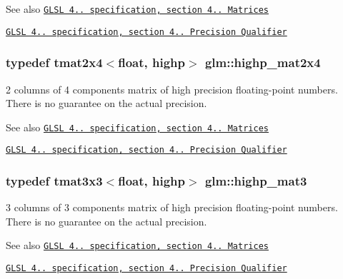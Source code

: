 \begin{DoxySeeAlso}{See also}
\href{http://www.opengl.org/registry/doc/GLSLangSpec.4.20.8.pdf}{\tt G\+L\+S\+L 4.. specification, section 4.. Matrices} 

\href{http://www.opengl.org/registry/doc/GLSLangSpec.4.20.8.pdf}{\tt G\+L\+S\+L 4.. specification, section 4.. Precision Qualifier} 
\end{DoxySeeAlso}
\hypertarget{namespaceglm_aa1e8839e63b86df92204fc1c4a25dd39}{}
\subsubsection[{highp\+\_\+mat2x4}]{\setlength{\rightskip}{0pt plus 5cm}typedef tmat2x4$<$float, highp$>$ {\bf glm\+::highp\+\_\+mat2x4}}\label{namespaceglm_aa1e8839e63b86df92204fc1c4a25dd39}
2 columns of 4 components matrix of high precision floating-\/point numbers. There is no guarantee on the actual precision.

\begin{DoxySeeAlso}{See also}
\href{http://www.opengl.org/registry/doc/GLSLangSpec.4.20.8.pdf}{\tt G\+L\+S\+L 4.. specification, section 4.. Matrices} 

\href{http://www.opengl.org/registry/doc/GLSLangSpec.4.20.8.pdf}{\tt G\+L\+S\+L 4.. specification, section 4.. Precision Qualifier} 
\end{DoxySeeAlso}
\hypertarget{namespaceglm_a9d182882c10433f84c024b13e1ee1557}{}
\subsubsection[{highp\+\_\+mat3}]{\setlength{\rightskip}{0pt plus 5cm}typedef tmat3x3$<$float, highp$>$ {\bf glm\+::highp\+\_\+mat3}}\label{namespaceglm_a9d182882c10433f84c024b13e1ee1557}
3 columns of 3 components matrix of high precision floating-\/point numbers. There is no guarantee on the actual precision.

\begin{DoxySeeAlso}{See also}
\href{http://www.opengl.org/registry/doc/GLSLangSpec.4.20.8.pdf}{\tt G\+L\+S\+L 4.. specification, section 4.. Matrices} 

\href{http://www.opengl.org/registry/doc/GLSLangSpec.4.20.8.pdf}{\tt G\+L\+S\+L 4.. specification, section 4.. Precision Qualifier} 
\end{DoxySeeAlso}
\hypertarget{namespaceglm_aff6a70f319061d2986f1f1db60266a44}{}
